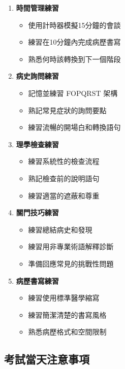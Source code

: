 \documentclass[12pt,a4paper]{article}
\begin{document}
\begin{enumerate}
    \item \textbf{時間管理練習}
    \begin{itemize}
        \item 使用計時器模擬15分鐘的會談
        \item 練習在10分鐘內完成病歷書寫
        \item 熟悉何時該轉換到下一個階段
    \end{itemize}
    
    \item \textbf{病史詢問練習}
    \begin{itemize}
        \item 記憶並練習 FOPQRST 架構
        \item 熟記常見症狀的詢問要點
        \item 練習流暢的開場白和轉換語句
    \end{itemize}
    
    \item \textbf{理學檢查練習}
    \begin{itemize}
        \item 練習系統性的檢查流程
        \item 熟記檢查前的說明語句
        \item 練習適當的遮蔽和尊重
    \end{itemize}
    
    \item \textbf{關門技巧練習}
    \begin{itemize}
        \item 練習總結病史和發現
        \item 練習用非專業術語解釋診斷
        \item 準備回應常見的挑戰性問題
    \end{itemize}
    
    \item \textbf{病歷書寫練習}
    \begin{itemize}
        \item 練習使用標準醫學縮寫
        \item 練習簡潔清楚的書寫風格
        \item 熟悉病歷格式和空間限制
    \end{itemize}
\end{enumerate}

\subsection{考試當天注意事項}
\end{document}
